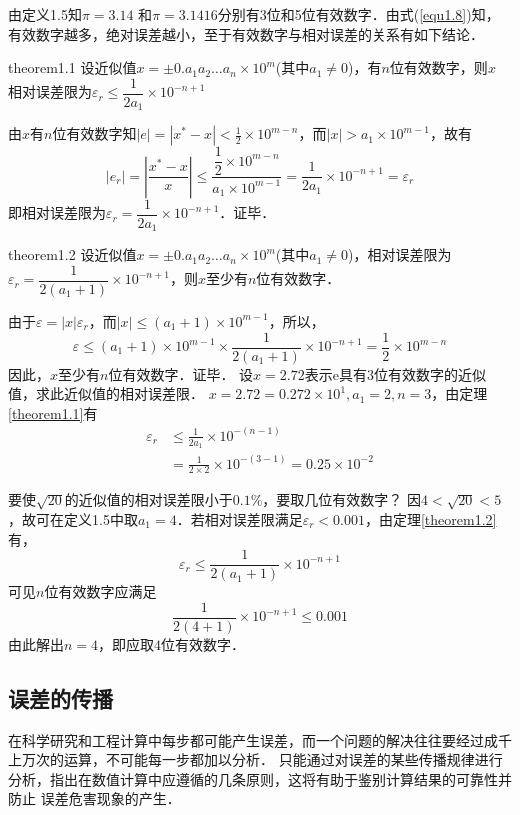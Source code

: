 由定义1.5知$\pi=3.14$
和$\pi=3.1416$分别有3位和5位有效数字．由式(\ref{equ1.8})知，有效数字越多，绝对误差越小，至于有效数字与相对误差的关系有如下结论．
\begin{theo}{}{theorem1.1}
设近似值$x=\pm0.a_1a_2\ldots
a_n\times10^m$(其中$a_1\neq0$)，有$n$位有效数字，则$x$
相对误差限为$\varepsilon_r\leqslant \dfrac{1}{2a_1}\times10^{-n+1}$
\end{theo}
\proof
由$x$有$n$位有效数字知$|e|=|x^*-x|<\frac{1}{2}\times10^{m-n}$，而$|x|>a_1\times10^{m-1}$，故有
$$|e_r|=\left|\frac{x^*-x}{x}\right|\leqslant \frac{\dfrac{1}{2}\times10^{m-n}}{a_1\times10^{m-1}}=\frac{1}{2a_1}\times10^{-n+1}=\varepsilon_r$$
即相对误差限为$\varepsilon_r=\dfrac{1}{2a_1}\times10^{-n+1}$．证毕．
\begin{theo}{}{theorem1.2} 设近似值$x=\pm0.a_1a_2\ldots
a_n\times10^m$(其中$a_1\neq0$)，相对误差限为$\varepsilon_r=\dfrac{1}{2(a_1+1)}\times10^{-n+1}$，则$x$至少有$n$位有效数字．
\end{theo}

\proof 由于$\varepsilon=|x|\varepsilon_r$，而$|x|\leqslant
(a_1+1)\times10^{m-1}$，所以，
$$\varepsilon\leqslant (a_1+1)\times10^{m-1}\times\frac{1}{2(a_1+1)}\times10^{-n+1}=\frac{1}{2}\times10^{m-n}$$
因此，$x$至少有$n$位有效数字．证毕．
\exam
设$x=2.72$表示$\mathrm{e}$具有3位有效数字的近似值，求此近似值的相对误差限．
\Solution
$x=2.72=0.272\times10^{1},a_1=2,n=3$，由定理\ref{theorem1.1}有
\begin{align*}
  \varepsilon_r &\leqslant\frac{1}{2a_1}\times 10^{-(n-1)} \\
                &=\frac{1}{2\times2}\times 10^{-(3-1)}=0.25\times 10^{-2}
\end{align*}

\exam
要使$\sqrt{20}$的近似值的相对误差限小于$0.1\%$，要取几位有效数字？
\Solution 因$4<\sqrt{20}<5$，故可在定义1.5中取$a_1=4$．若相对误差限满足$\varepsilon_r<0.001$，由定理\ref{theorem1.2}有，
$$\varepsilon_r\leqslant \frac{1}{2(a_1+1)}\times10^{-n+1}$$
可见$n$位有效数字应满足
$$\frac{1}{2(4+1)}\times10^{-n+1}\leqslant 0.001$$
由此解出$n=4$，即应取$4$位有效数字．

\subsection{误差的传播}
在科学研究和工程计算中每步都可能产生误差，而一个问题的解决往往要经过成千上万次的运算，不可能每一步都加以分析．
只能通过对误差的某些传播规律进行分析，指出在数值计算中应遵循的几条原则，这将有助于鉴别计算结果的可靠性并防止
误差危害现象的产生．

